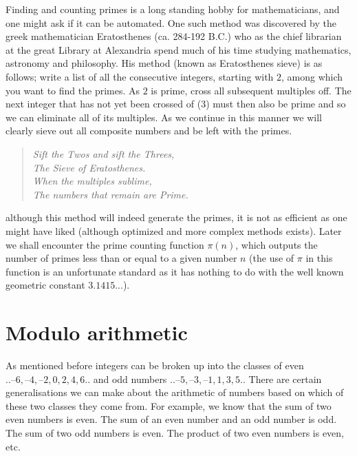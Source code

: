 Finding and counting primes is a long standing hobby for mathematicians, and one might ask if it can be automated. One such method was discovered by the greek mathematician Eratosthenes (ca. 284-192 B.C.) who as the chief librarian at the great Library at Alexandria spend much of his time studying mathematics, astronomy and philosophy. His method (known as Eratosthenes sieve) is as follows; write a list of all the consecutive integers, starting with $2$, among which you want to find the primes. As $2$ is prime, cross all subsequent multiples off. The next integer that has not yet been crossed of (3) must then also be prime and so we can eliminate all of its multiples. As we continue in this manner we will clearly sieve out all composite numbers and be left with the primes.
\begin{verse}\emph{
Sift the Twos and sift the Threes,\\
The Sieve of Eratosthenes.\\
When the multiples sublime,\\
The numbers that remain are Prime.}
\end{verse}
although this method will indeed generate the primes, it is not as efficient as one might have liked (although optimized and more complex methods exists). Later we shall encounter the prime counting function $\pi(n)$, which outputs the number of primes less than or equal to a given number $n$ (the use of $\pi$ in this function is an unfortunate standard as it has nothing to do with the well known geometric constant $3.1415...$).


\section{Modulo arithmetic}
As mentioned before integers can be broken up into the classes of even $..–6, –4, –2, 0, 2, 4, 6..$ and odd numbers $..–5, –3, –1, 1, 3, 5..$ There are certain generalisations we can make about the arithmetic of numbers based on which of these two classes they come from. For example, we know that the sum of two even numbers is even. The sum of an even number and an odd number is odd. The sum of two odd numbers is even. The product of two even numbers is even, etc.

